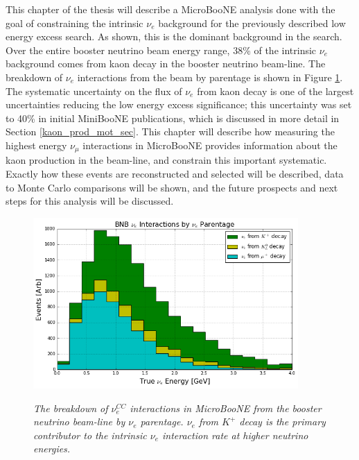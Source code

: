
This chapter of the thesis will describe a MicroBooNE analysis done with the goal of constraining the intrinsic $\nu_e$ background for the previously described low energy excess search. As shown, this is the dominant background in the search. Over the entire booster neutrino beam energy range, 38\% of the intrinsic $\nu_e$ background comes from kaon decay in the booster neutrino beam-line. The breakdown of $\nu_e$ interactions from the beam by parentage is shown in Figure \ref{BNB_nue_parentage_plot}. The systematic uncertainty on the flux of $\nu_e$ from kaon decay is one of the largest uncertainties reducing the low energy excess significance; this uncertainty was set to 40\% in initial MiniBooNE publications, which is discussed in more detail in Section \ref{kaon_prod_mot_sec}. This chapter will describe how measuring the highest energy $\nu_\mu$ interactions in MicroBooNE provides information about the kaon production in the beam-line, and constrain this important systematic. Exactly how these events are reconstructed and selected will be described, data to Monte Carlo comparisons will be shown, and the future prospects and next steps for this analysis will be discussed.

\begin{figure}[ht!]
\centering
	\includegraphics[width=0.9\textwidth]{Figures/BNB_nue_parentage_plot.png} \\
\caption{\textit{The breakdown of $\nu_e^{CC}$ interactions in MicroBooNE from the booster neutrino beam-line by $\nu_e$ parentage. $\nu_e$ from $K^+$ decay is the primary contributor to the intrinsic $\nu_e$ interaction rate at higher neutrino energies.}}\label{BNB_nue_parentage_plot}
\end{figure}

